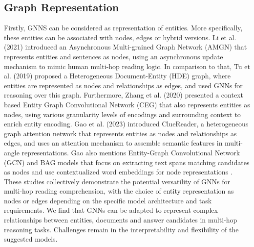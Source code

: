 \documentclass[sigplan,screen]{acmart}
\begin{document}
\subsection{Graph Representation}
Firstly, GNNS can be considered as representation of entities. More specifically, these entities can be associated with nodes, edges or hybrid versions. 
Li et al. (2021) \cite{RN131} introduced an Asynchronous Multi-grained Graph Network (AMGN) that represents entities and sentences as nodes, using an asynchronous 
update mechanism to mimic human multi-hop reading logic. In comparison to that, Tu et al. (2019) \cite{RN124} proposed a Heterogeneous Document-Entity (HDE) 
graph, where entities are represented as nodes and relationships as edges, and used GNNs for reasoning over this graph. Furthermore, Zhang et al. (2020) \cite{RN170} presented 
a context based Entity Graph Convolutional Network (CEG) that also represents entities as nodes, using various granularity levels of encodings and surrounding context 
to enrich entity encoding. Gao et al. (2023) \cite{RN136} introduced ClueReader, a heterogeneous graph attention network that represents entities as nodes and
relationships as edges, and uses an attention mechanism to assemble semantic features in multi-angle representations. Gao also mentions Entity-Graph 
Convolutional Network (GCN) and BAG models that focus on extracting text spans matching candidates as nodes and use contextualized word embeddings
for node representations \cite{RN136}. These studies collectively demonstrate the potential versatility of GNNs for multi-hop reading comprehension, with the
choice of entity representation as nodes or edges depending on the specific model architecture and task requirements. We find that GNNs can be adapted
to represent complex relationships between entities, documents and answer candidates in multi-hop reasoning tasks. Challenges remain in the 
interpretability and flexibility of the suggested models.
\end{document}
